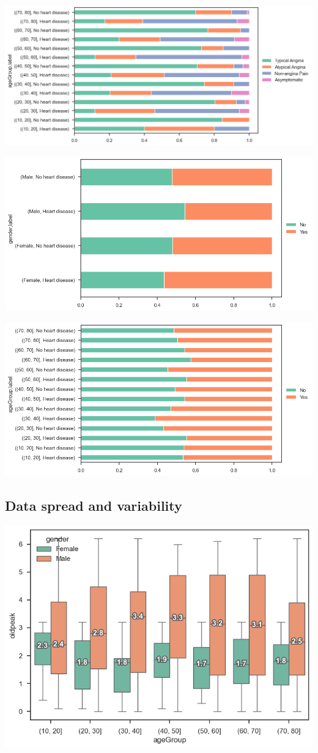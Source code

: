 \includegraphics[width=0.8\linewidth]{media/frequency-10-agegroup-paintype.png}

\includegraphics[width=0.8\linewidth]{media/frequency-11-gender-exerciseangina.png}

\includegraphics[width=0.8\linewidth]{media/frequency-12-agegroup-exerciseangina.png}

\subsection{Data spread and variability}


\includegraphics[width=0.8\linewidth]{media/boxplot-01-agegroup-gender-oldpeak.png}

